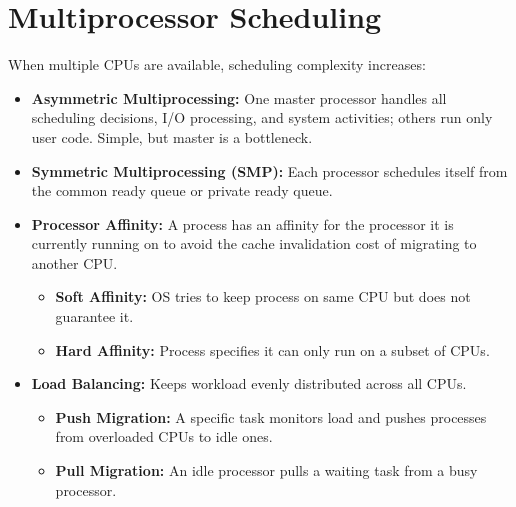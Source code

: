 \documentclass[12pt,a4paper]{article}
\begin{document}
\begin{tcolorbox}[tikzbox, title={Multilevel Feedback Queue Structure}]
\centering
{}
\end{tcolorbox}

\section{Multiprocessor Scheduling}

When multiple CPUs are available, scheduling complexity increases:
\begin{itemize}[leftmargin=*, itemsep=3pt]
  \item \textbf{Asymmetric Multiprocessing:} One master processor handles all scheduling decisions, I/O processing, and system activities; others run only user code. Simple, but master is a bottleneck.
  \item \textbf{Symmetric Multiprocessing (SMP):} Each processor schedules itself from the common ready queue or private ready queue.
  \item \textbf{Processor Affinity:} A process has an affinity for the processor it is currently running on to avoid the cache invalidation cost of migrating to another CPU.
  \begin{itemize}[leftmargin=*, itemsep=2.5pt, topsep=0pt]
    \item \textbf{Soft Affinity:} OS tries to keep process on same CPU but does not guarantee it.
    \item \textbf{Hard Affinity:} Process specifies it can only run on a subset of CPUs.
  \end{itemize}
  \item \textbf{Load Balancing:} Keeps workload evenly distributed across all CPUs.
  \begin{itemize}[leftmargin=*, itemsep=2.5pt, topsep=0pt]
    \item \textbf{Push Migration:} A specific task monitors load and pushes processes from overloaded CPUs to idle ones.
    \item \textbf{Pull Migration:} An idle processor pulls a waiting task from a busy processor.
    \end{itemize}
  \end{itemize}
\end{document}
